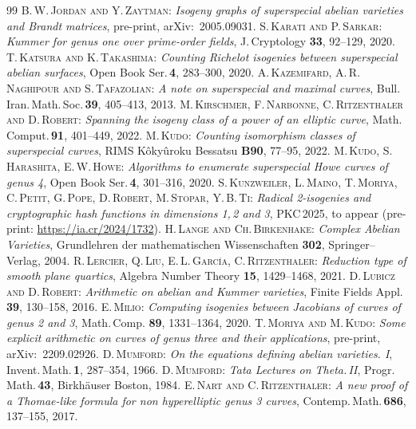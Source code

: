 \documentclass{amsart}
\theoremstyle{definition}
\theoremstyle{plain}
\begin{document}
\begin{thebibliography}{99}
 \textsc{B.\,W.\,Jordan and Y.\,Zaytman}: \textit{Isogeny graphs of superspecial abelian varieties and Brandt matrices}, pre-print, arXiv:\ 2005.09031.
 \textsc{S.\,Karati and P.\,Sarkar}: \textit{Kummer for genus one over prime-order fields}, J.\,Cryptology {\bf 33}, 92--129, 2020.
 \textsc{T.\,Katsura and K.\,Takashima}: \textit{Counting Richelot isogenies between superspecial abelian surfaces}, Open Book Ser.\,{\bf 4}, 283--300, 2020.
 \textsc{A.\,Kazemifard, A.\,R.\,Naghipour and S.\,Tafazolian}: \textit{A note on superspecial and maximal curves}, Bull.\,Iran.\,Math.\,Soc.\,{\bf 39}, 405--413, 2013.
 \textsc{M.\,Kirschmer, F.\,Narbonne, C.\,Ritzenthaler and D.\,Robert}: \textit{Spanning the isogeny class of a power of an elliptic curve}, Math.\,Comput.\,{\bf 91}, 401--449, 2022.
 \textsc{M.\,Kudo}: \textit{Counting isomorphism classes of superspecial curves}, RIMS Kôkyûroku Bessatsu {\bf B90}, 77--95, 2022.
 \textsc{M.\,Kudo, S.\,Harashita, E.\,W.\,Howe}: \textit{Algorithms to enumerate superspecial Howe curves of genus 4}, Open Book Ser.\,{\bf 4}, 301--316, 2020.
 \textsc{S.\,Kunzweiler, L.\,Maino, T.\,Moriya, C.\,Petit, G.\,Pope, D.\,Robert, M.\,Stopar, Y.\,B.\,Ti}: \textit{Radical 2-isogenies and cryptographic hash functions in dimensions 1,\,2 and 3}, PKC\,2025, to appear (pre-print: \url{https://ia.cr/2024/1732}).
 \textsc{H.\,Lange and Ch.\,Birkenhake}: \textit{Complex Abelian Varieties}, Grundlehren der mathematischen Wissenschaften {\bf 302}, Springer--Verlag, 2004.
 \textsc{R.\,Lercier, Q.\,Liu, E.\,L.\,García, C.\,Ritzenthaler}: \textit{Reduction type of smooth plane quartics}, Algebra Number Theory {\bf 15}, 1429--1468, 2021.
 \textsc{D.\,Lubicz and D.\,Robert}: \textit{Arithmetic on abelian and Kummer varieties}, Finite Fields Appl. {\bf 39}, 130--158, 2016.
 \textsc{E.\,Milio}: \textit{Computing isogenies between Jacobians of curves of genus 2 and 3}, Math.\,Comp. {\bf 89}, 1331--1364, 2020.
 \textsc{T.\,Moriya and M.\,Kudo}: \textit{Some explicit arithmetic on curves of genus three and their applications}, pre-print, arXiv:\ 2209.02926.
 \textsc{D.\,Mumford}: \textit{On the equations defining abelian varieties. I}, Invent.\,Math.\,{\bf 1}, 287--354, 1966.
 \textsc{D.\,Mumford}: \textit{Tata Lectures on Theta.\,II}, Progr.\,Math.\,{\bf 43}, Birkh\"{a}user Boston, 1984.
 \textsc{E.\,Nart and C.\,Ritzenthaler}: \textit{A new proof of a Thomae-like formula for non hyperelliptic genus 3 curves}, Contemp.\,Math.\,{\bf 686}, 137--155, 2017.

\end{thebibliography}
\end{document}
